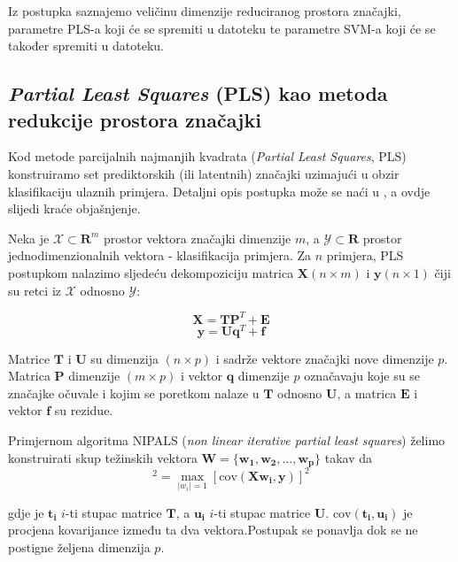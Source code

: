 \documentclass[seminar]{fer}
\begin{document}
Iz postupka saznajemo veličinu dimenzije reduciranog prostora značajki, parametre PLS-a koji će se spremiti u datoteku te parametre SVM-a koji će se također spremiti u datoteku.

\subsection{\emph{Partial Least Squares} (PLS) kao metoda redukcije prostora značajki} 
Kod metode parcijalnih najmanjih kvadrata (\emph{Partial Least Squares}, PLS) konstruiramo set prediktorskih (ili latentnih) značajki uzimajući u obzir klasifikaciju ulaznih primjera. 
Detaljni opis postupka može se naći u \cite{PLS}, a ovdje slijedi kraće objašnjenje.

Neka je $\mathcal{X} \subset \mathbf{R}^m$ prostor vektora značajki dimenzije $m$, a $\mathcal{Y} \subset \mathbf{R}$ prostor jednodimenzionalnih vektora - klasifikacija primjera. Za $n$ primjera, PLS postupkom nalazimo sljedeću dekompoziciju matrica $\mathbf{X} (n \times m) $ i $\mathbf{y} (n \times 1)$ čiji su retci iz $\mathcal{X}$ odnosno $\mathcal{Y}$:

\begin{equation*}
\mathbf{X} = \mathbf{T} \mathbf{P}^T + \mathbf{E} 
\end{equation*}
\begin{equation*}
\mathbf{y} = \mathbf{U} \mathbf{q}^T + \mathbf{f} 
\end{equation*}

Matrice $\mathbf{T}$ i $\mathbf{U}$ su dimenzija $(n \times p)$ i sadrže vektore značajki nove dimenzije $p$. Matrica $\mathbf{P}$ dimenzije $(m \times p)$ i vektor $\mathbf{q}$ dimenzije $p$ označavaju koje su se značajke očuvale i kojim se poretkom nalaze u $\mathbf{T}$ odnosno $\mathbf{U}$, a matrica $\mathbf{E}$ i vektor $\mathbf{f}$ su rezidue.

Primjernom algoritma NIPALS (\emph{non linear iterative partial least squares}) želimo konstruirati skup težinskih vektora $\mathbf{W} = \{\mathbf{w_1}, \mathbf{w_2}, \dots,
\mathbf{w_p} \}$ takav da 
\begin{equation*}
[\mathrm{cov}(\mathbf{t_i}, \mathbf{u_i})]^ 2 = \max_{|w_i| = 1} [\mathrm{cov}(\mathbf{X}\mathbf{w_i} ,\mathbf{y})]^ 2
\end{equation*}

gdje je $\mathbf{t_i}$ $i$-ti stupac matrice $\mathbf{T}$, a $\mathbf{u_i}$ $i$-ti stupac matrice $\mathbf{U}$. $\mathrm{cov}(\mathbf{t_i}, \mathbf{u_i})$ je procjena kovarijance između ta dva vektora.Postupak se ponavlja dok se ne postigne željena dimenzija $p$. 
\end{document}
